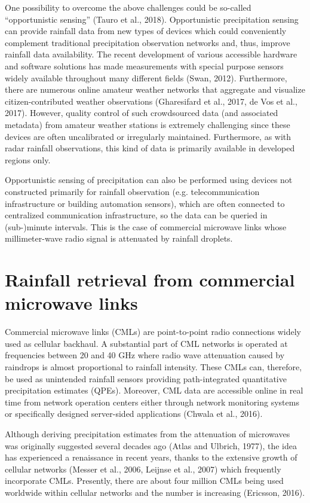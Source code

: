 \documentclass{ctuthesis}\usepackage[]{graphicx}\usepackage[]{color}
\begin{document}
One possibility to overcome the above challenges could be so-called \enquote{opportunistic sensing} (Tauro et al., 2018). Opportunistic precipitation sensing can provide rainfall data from new types of devices which could conveniently complement traditional precipitation observation networks and, thus, improve rainfall data availability. The recent development of various accessible hardware and software solutions has made measurements with special purpose sensors widely available throughout many different fields (Swan, 2012). Furthermore, there are numerous online amateur weather networks that aggregate and visualize citizen-contributed weather observations (Gharesifard et al., 2017, de Vos et al., 2017). However, quality control of such crowdsourced data (and associated metadata) from amateur weather stations is extremely challenging since these devices are often uncalibrated or irregularly maintained. Furthermore, as with radar rainfall observations, this kind of data is primarily available in developed regions only.

Opportunistic sensing of precipitation can also be performed using devices not constructed primarily for rainfall observation (e.g. telecommunication infrastructure or building automation sensors), which are often connected to centralized communication infrastructure, so the data can be queried in (sub-)minute intervals. This is the case of commercial microwave links whose millimeter-wave radio signal is attenuated by rainfall droplets.


\section{Rainfall retrieval from commercial microwave links}

Commercial microwave links (CMLs) are point-to-point radio connections widely used as cellular backhaul. A substantial part of CML networks is operated at frequencies between 20 and 40 GHz where radio wave attenuation caused by raindrops is almost proportional to rainfall intensity. These CMLs can, therefore, be used as unintended rainfall sensors providing path-integrated quantitative precipitation estimates (QPEs). Moreover, CML data are accessible online in real time from network operation centers either through network monitoring systems or specifically designed server-sided applications (Chwala et al., 2016).

Although deriving precipitation estimates from the attenuation of microwaves was originally suggested several decades ago (Atlas and Ulbrich, 1977), the idea has experienced a renaissance in recent years, thanks to the extensive growth of cellular networks (Messer et al., 2006, Leijnse et al., 2007) which frequently incorporate CMLs. Presently, there are about four million CMLs being used worldwide within cellular networks and the number is increasing (Ericsson, 2016).
\end{document}
